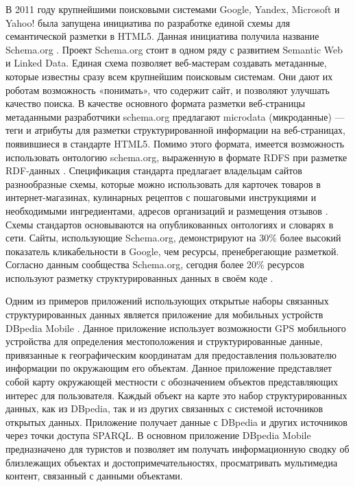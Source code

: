 В 2011 году крупнейшими поисковыми системами Google, Yandex, Microsoft и Yahoo! была запущена инициатива по разработке единой схемы для семантической разметки в HTML5. Данная инициатива получила название Schema.org \cite{ronallo2012html5}. Проект Schema.org стоит в одном ряду с развитием Semantic Web и Linked Data. Единая схема позволяет веб-мастерам создавать метаданные, которые известны сразу всем крупнейшим поисковым системам. Они дают их роботам возможность «понимать», что содержит сайт, и позволяют улучшать качество поиска. В качестве основного формата разметки веб-страницы метаданными разработчики schema.org предлагают microdata (микроданные) — теги и атрибуты для разметки структурированной информации на веб-страницах, появившиеся в стандарте HTML5. Помимо этого формата, имеется возможность использовать онтологию schema.org, выраженную в формате RDFS при разметке RDF-данных . Спецификация стандарта предлагает владельцам сайтов разнообразные схемы, которые можно использовать для карточек товаров в интернет-магазинах, кулинарных рецептов с пошаговыми инструкциями и необходимыми ингредиентами, адресов организаций и размещения отзывов \cite{barker2014learning}. Схемы стандартов основываются на опубликованных онтологиях и словарях в сети. Сайты, использующие Schema.org, демонстрируют на 30\% более высокий показатель кликабельности в Google, чем ресурсы, пренебрегающие разметкой. Согласно данным сообщества Schema.org, сегодня более 20\% ресурсов используют разметку структурированных данных в своём коде \cite{patel2014analyzing}.

Одним из примеров приложений использующих открытые наборы связанных структурированных данных является приложение для мобильных устройств DBpedia Mobile \cite{becker2008dbpedia}. Данное приложение использует возможности GPS мобильного устройства для определения местоположения и структурированные данные, привязанные к географическим координатам для предоставления пользователю информации по окружающим его объектам. Данное приложение представляет собой карту окружающей местности с обозначением объектов представляющих интерес для пользователя. Каждый объект на карте это набор структурированных данных, как из DBpedia, так и из других связанных с системой источников открытых данных. Приложение получает данные с DBpedia и других источников через точки доступа SPARQL. В основном приложение DBpedia Mobile предназначено для туристов и позволяет им получать информационную сводку об близлежащих объектах и достопримечательностях, просматривать мультимедиа контент, связанный с данными объектами. 

